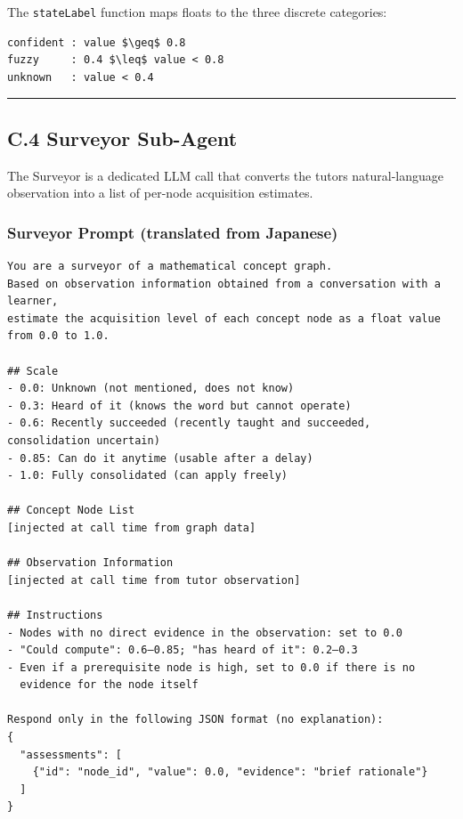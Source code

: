 \documentclass[
]{article}
\begin{document}
The \texttt{stateLabel} function maps floats to the three discrete categories:

\begin{verbatim}
confident : value $\geq$ 0.8
fuzzy     : 0.4 $\leq$ value < 0.8
unknown   : value < 0.4
\end{verbatim}

\begin{center}\rule{0.5\linewidth}{0.5pt}\end{center}

\subsection{C.4 Surveyor Sub-Agent}\label{c4-surveyor-sub-agent}

The Surveyor is a dedicated LLM call that converts the tutor\textquotesingle s natural-language observation into a list of per-node acquisition estimates.

\subsubsection{Surveyor Prompt (translated from Japanese)}\label{surveyor-prompt-translated-from-japanese}

\begin{verbatim}
You are a surveyor of a mathematical concept graph.
Based on observation information obtained from a conversation with a learner,
estimate the acquisition level of each concept node as a float value from 0.0 to 1.0.

## Scale
- 0.0: Unknown (not mentioned, does not know)
- 0.3: Heard of it (knows the word but cannot operate)
- 0.6: Recently succeeded (recently taught and succeeded, consolidation uncertain)
- 0.85: Can do it anytime (usable after a delay)
- 1.0: Fully consolidated (can apply freely)

## Concept Node List
[injected at call time from graph data]

## Observation Information
[injected at call time from tutor observation]

## Instructions
- Nodes with no direct evidence in the observation: set to 0.0
- "Could compute": 0.6–0.85; "has heard of it": 0.2–0.3
- Even if a prerequisite node is high, set to 0.0 if there is no
  evidence for the node itself

Respond only in the following JSON format (no explanation):
{
  "assessments": [
    {"id": "node_id", "value": 0.0, "evidence": "brief rationale"}
  ]
}
\end{verbatim}
\end{document}
